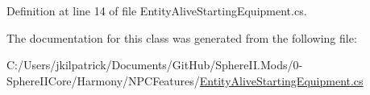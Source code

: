 Definition at line 14 of file Entity\+Alive\+Starting\+Equipment.\+cs.



The documentation for this class was generated from the following file\+:\begin{DoxyCompactItemize}
\item 
C\+:/\+Users/jkilpatrick/\+Documents/\+Git\+Hub/\+Sphere\+I\+I.\+Mods/0-\/\+Sphere\+I\+I\+Core/\+Harmony/\+N\+P\+C\+Features/\mbox{\hyperlink{_entity_alive_starting_equipment_8cs}{Entity\+Alive\+Starting\+Equipment.\+cs}}\end{DoxyCompactItemize}
